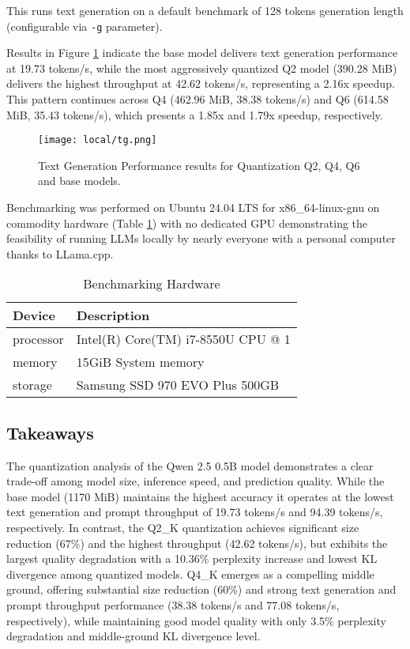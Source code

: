 This runs text generation on a default benchmark of 128 tokens generation length (configurable via \texttt{-g} parameter).

Results in Figure \ref{fig:tg} indicate the base model delivers text generation performance at 19.73 tokens/s, while the most aggressively quantized Q2 model (390.28 MiB) delivers the highest throughput at 42.62 tokens/s, representing a 2.16x speedup. This pattern continues across Q4 (462.96 MiB, 38.38 tokens/s) and Q6 (614.58 MiB, 35.43 tokens/s), which presents a 1.85x and 1.79x speedup, respectively.

\begin{figure}[H]
\centering
\texttt{[image: local/tg.png]}
\caption{Text Generation Performance results for Quantization Q2, Q4, Q6 and base models.}
\label{fig:tg}
\end{figure}

Benchmarking was performed on Ubuntu 24.04 LTS for x86\_64-linux-gnu on commodity hardware (Table \ref{tab:benchmarking-hardware}) with no dedicated GPU demonstrating the feasibility of running LLMs locally by nearly everyone with a personal computer thanks to LLama.cpp.

\begin{table}[H]
\centering
\caption{Benchmarking Hardware}
\label{tab:benchmarking-hardware}
\begin{tabular}{ll}
\toprule
Device & Description \\
\midrule
processor & Intel(R) Core(TM) i7-8550U CPU @ 1 \\
memory & 15GiB System memory \\
storage & Samsung SSD 970 EVO Plus 500GB \\
\bottomrule
\end{tabular}
\end{table}

\subsection{Takeaways}

The quantization analysis of the Qwen 2.5 0.5B model demonstrates a clear trade-off among model size, inference speed, and prediction quality. While the base model (1170 MiB) maintains the highest accuracy it operates at the lowest text generation and prompt throughput of 19.73 tokens/s and 94.39 tokens/s, respectively. In contrast, the Q2\_K quantization achieves significant size reduction (67\%) and the highest throughput (42.62 tokens/s), but exhibits the largest quality degradation with a 10.36\% perplexity increase and lowest KL divergence among quantized models. Q4\_K emerges as a compelling middle ground, offering substantial size reduction (60\%) and strong text generation and prompt throughput performance (38.38 tokens/s and 77.08 tokens/s, respectively), while maintaining good model quality with only 3.5\% perplexity degradation and middle-ground KL divergence level. 

